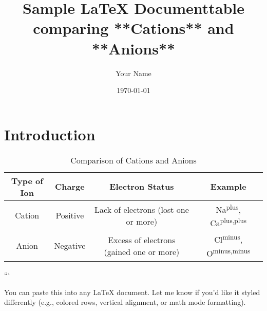 \documentclass{article}
\title{Sample LaTeX Document}
\author{Your Name}
\date{\today}
\begin{document}
\maketitle

\section{Introduction}


\title{table comparing **Cations** and **Anions**}

\begin{table}[h!]
	\centering
	\begin{tabular}{|c|c|c|c|}
		\hline
		\textbf{Type of Ion} & \textbf{Charge} & \textbf{Electron Status} & \textbf{Example} \\
		\hline
		Cation & Positive & Lack of electrons (lost one or more) & Na\textsuperscript{plus}, Ca\textsuperscript{plus,plus} \\
		\hline
		Anion & Negative & Excess of electrons (gained one or more) & Cl\textsuperscript{minus}, O\textsuperscript{minus,minus} \\
		\hline
	\end{tabular}
	\caption{Comparison of Cations and Anions}
\end{table}
```

You can paste this into any LaTeX document. Let me know if you'd like it styled differently (e.g., colored rows, vertical alignment, or math mode formatting).
\end{document}
